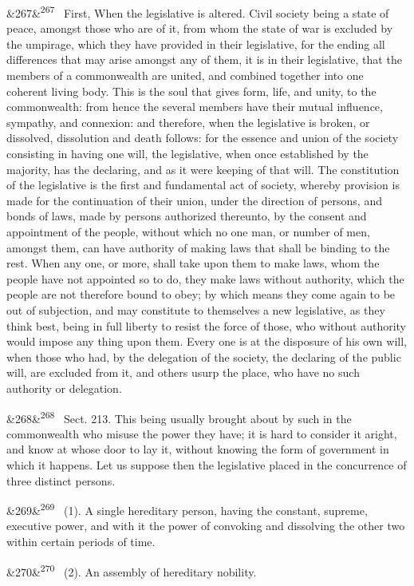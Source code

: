 \documentclass[12pt]{article}
\newcommand{\para}[1][]{\par\noindent\ifx&#1&\else\textsuperscript{\footnotesize #1}~\fi}
\begin{document}
\para[267] First, When the legislative is altered. Civil society being a state of peace, amongst those who are of it, from whom the state of war is excluded by the umpirage, which they have provided in their legislative, for the ending all differences that may arise amongst any of them, it is in their legislative, that the members of a commonwealth are united, and combined together into one coherent living body. This is the soul that gives form, life, and unity, to the commonwealth: from hence the several members have their mutual influence, sympathy, and connexion: and therefore, when the legislative is broken, or dissolved, dissolution and death follows: for the essence and union of the society consisting in having one will, the legislative, when once established by the majority, has the declaring, and as it were keeping of that will. The constitution of the legislative is the first and fundamental act of society, whereby provision is made for the continuation of their union, under the direction of persons, and bonds of laws, made by persons authorized thereunto, by the consent and appointment of the people, without which no one man, or number of men, amongst them, can have authority of making laws that shall be binding to the rest. When any one, or more, shall take upon them to make laws, whom the people have not appointed so to do, they make laws without authority, which the people are not therefore bound to obey; by which means they come again to be out of subjection, and may constitute to themselves a new legislative, as they think best, being in full liberty to resist the force of those, who without authority would impose any thing upon them. Every one is at the disposure of his own will, when those who had, by the delegation of the society, the declaring of the public will, are excluded from it, and others usurp the place, who have no such authority or delegation.

\para[268] Sect. 213. This being usually brought about by such in the commonwealth who misuse the power they have; it is hard to consider it aright, and know at whose door to lay it, without knowing the form of government in which it happens. Let us suppose then the legislative placed in the concurrence of three distinct persons.

\para[269] (1). A single hereditary person, having the constant, supreme, executive power, and with it the power of convoking and dissolving the other two within certain periods of time.

\para[270] (2). An assembly of hereditary nobility.
\end{document}
